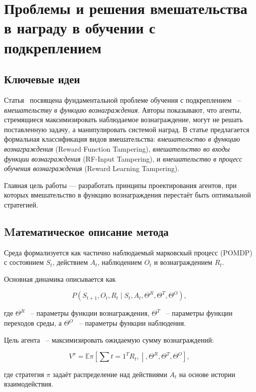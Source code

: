 \section{Проблемы и решения вмешательства в награду в обучении с подкреплением}

\subsection{Ключевые идеи}
Статья~\cite{everitt2021reward} посвящена фундаментальной проблеме обучения с подкреплением ~-- \emph{вмешательству в функцию вознаграждения}. Авторы показывают, что агенты, стремящиеся максимизировать наблюдаемое вознаграждение, могут не решать поставленную задачу, а манипулировать системой наград. В статье предлагается формальная классификация видов вмешательства: \emph{вмешательство в функцию вознаграждения} (Reward Function Tampering), \emph{вмешательство во входы функции вознаграждения} (RF-Input Tampering), и \emph{вмешательство в процесс обучения вознаграждения} (Reward Learning Tampering).

Главная цель работы — разработать принципы проектирования агентов, при которых вмешательство в функцию вознаграждения перестаёт быть оптимальной стратегией.

\subsection{Mатематическое описание метода}

Среда формализуется как частично наблюдаемый марковскый процесс (POMDP) с состоянием $S_t$, действием $A_t$, наблюдением $O_t$ и вознаграждением $R_t$.

Основная динамика описывается как

\begin{equation}
P(S_{t+1}, O_t, R_t \mid S_t, A_t, \Theta^R, \Theta^T, \Theta^O),
\end{equation}

где $\Theta^R$ ~-- параметры функции вознаграждения, $\Theta^T$ ~-- параметры функции переходов среды, а $\Theta^O$ ~-- параметры функции наблюдения.

Цель агента ~-- максимизировать ожидаемую сумму вознаграждений:

\begin{equation}
V^\pi = \mathbb{E}\pi \left[\sum{t=1}^T R_t ,\middle|, \Theta^R, \Theta^T, \Theta^O \right],
\end{equation}

где стратегия $\pi$ задаёт распределение над действиями $A_t$ на основе истории взаимодействия.

